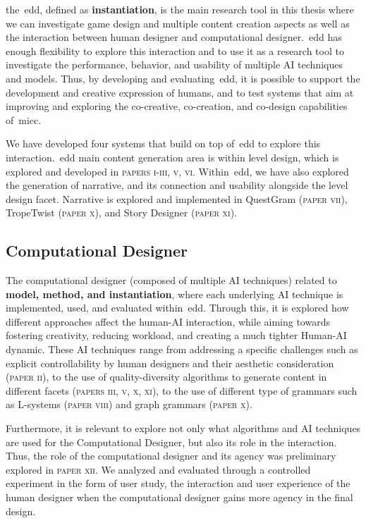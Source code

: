 the~\acrlong{edd}, defined as \textbf{instantiation}, is the main research tool in this thesis where we can investigate game design and multiple content creation aspects as well as the interaction between human designer and computational designer.~\acrshort{edd} has enough flexibility to explore this interaction and to use it as a research tool to investigate the performance, behavior, and usability of multiple AI techniques and models. Thus, by developing and evaluating~\acrshort{edd}, it is possible to support the development and creative expression of humans, and to test systems that aim at improving and exploring the co-creative, co-creation, and co-design capabilities of~\acrshort{micc}.

We have developed four systems that build on top of~\acrshort{edd} to explore this interaction.~\acrshort{edd} main content generation area is within level design, which is explored and developed in \textsc{papers i-iii, v, vi}. Within~\acrshort{edd}, we have also explored the generation of narrative, and its connection and usability alongside the level design facet. Narrative is explored and implemented in QuestGram (\textsc{paper vii}), TropeTwist (\textsc{paper x}), and Story Designer (\textsc{paper xi}).


\subsection{Computational Designer}

The computational designer (composed of multiple AI techniques) related to \textbf{model, method, and instantiation}, where each underlying AI technique is implemented, used, and evaluated within~\acrshort{edd}. Through this, it is explored how different approaches affect the human-AI interaction, while aiming towards fostering creativity, reducing workload, and creating a much tighter Human-AI dynamic. These AI techniques range from addressing a specific challenges such as explicit controllability by human designers and their aesthetic consideration (\textsc{paper ii}), to the use of quality-diversity algorithms to generate content in different facets (\textsc{papers iii, v, x, xi}), to the use of different type of grammars such as L-systems (\textsc{paper viii}) and graph grammars (\textsc{paper x}).

Furthermore, it is relevant to explore not only what algorithms and AI techniques are used for the Computational Designer, but also its role in the interaction. Thus, the role of the computational designer and its agency was preliminary explored in \textsc{paper xii}. We analyzed and evaluated through a controlled experiment in the form of user study, the interaction and user experience of the human designer when the computational designer gains more agency in the final design. 


